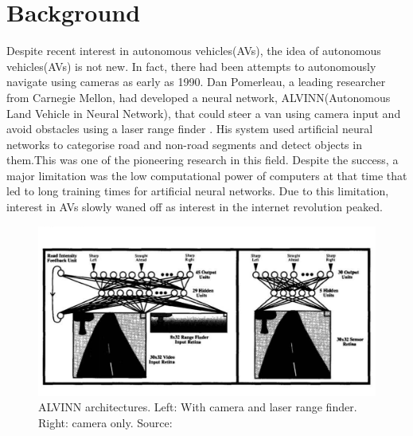 \let\textcircled=\pgftextcircled


\chapter{Background}
\label{chap:background}

Despite recent interest in autonomous vehicles(AVs), the idea of autonomous vehicles(AVs) is not new. In fact, there had been attempts to autonomously navigate using cameras as early as 1990. Dan Pomerleau, a leading researcher from Carnegie Mellon, had developed a neural network, ALVINN(Autonomous Land Vehicle in Neural Network)\cite{pomerleau1989alvinn},  that could steer a van using camera input and avoid obstacles using a laser range finder . His system used artificial neural networks to categorise road and non-road segments and detect objects in them\cite{pomerleau1991rapidly}.This was one of the pioneering research in this field. Despite the success, a major limitation was the low computational power of computers at that time that led to long training times for artificial neural networks. Due to this limitation, interest in AVs slowly waned off as interest in the internet revolution peaked. 

 \begin{figure}[h]
	\centering
	\includegraphics[width=\textwidth]{images/alvinn.png}
	\caption{ALVINN architectures. Left: With camera and laser range finder. Right: camera only. Source: \cite{pomerleau1991rapidly}}
	\label{fig:alvinn}
\end{figure}

